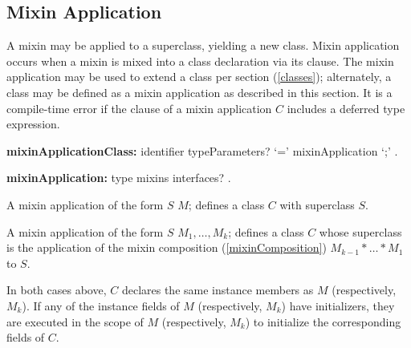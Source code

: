 \documentclass{article}
\newcommand{\code}[1]{{\sf #1}}
\begin{document}

\subsection{Mixin Application}

\LMHash{}
A mixin may be applied to a superclass, yielding a new class. Mixin application occurs when a mixin is mixed into a class declaration via its \WITH{} clause.  The mixin application may be used to extend a class per section (\ref{classes}); alternately, a class may be defined as a mixin application as described in this section.   It is a compile-time error if the \WITH{} clause of a mixin application $C$ includes a deferred type expression.


\begin{grammar}
{\bf  mixinApplicationClass:}
	identifier typeParameters? `='  mixinApplication `{\escapegrammar ;}' .
	
{\bf mixinApplication:}
     type mixins interfaces? 
    .
\end{grammar}

\LMHash{}
A  mixin application of the form  \code{$S$ \WITH{} $M$;} defines a class  $C$ with superclass  $S$. 

\LMHash{}
A  mixin application of the form  \code{$S$ \WITH{} $M_1, \ldots, M_k$;} defines a class  $C$ whose superclass is the application of the mixin composition (\ref{mixinComposition}) $M_{k-1} * \ldots * M_1$ to $S$. 

\LMHash{}
In both cases above, $C$ declares the same instance members as $M$ (respectively, $M_k$). If any of the instance fields of $M$ (respectively, $M_k$) have initializers, they are executed in the scope of $M$ (respectively, $M_k$) to initialize the corresponding fields of $C$. 
\end{document}
